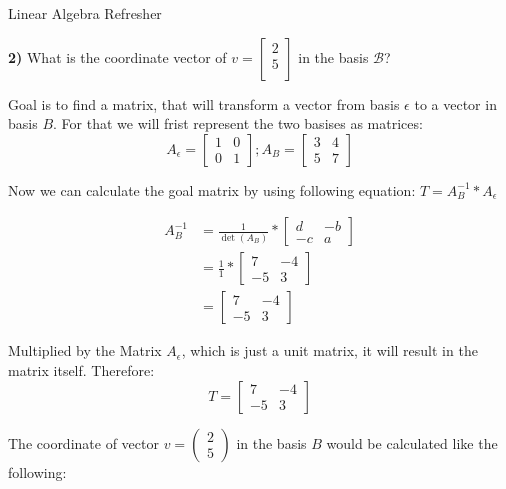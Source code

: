 \documentclass[
	english,
        solution=true
	]{tudaexercise}
\begin{document}
\begin{task}[points=28]{Linear Algebra Refresher}
\begin{subtask}[points=5,title=Basis Transformation ]
\textbf{2)} What is the coordinate vector of $v=\begin{bmatrix}
2\\
5\\
\end{bmatrix}$ in the basis $\mathcal{B}$?

\begin{solution}
Goal is to find a matrix, that will transform a vector from basis $\epsilon$ to a vector in basis $B$. For that we will frist represent the two basises as matrices:
\[A_\epsilon=\begin{bmatrix}
    1 & 0 \\0 & 1
\end{bmatrix}; A_B=\begin{bmatrix}
    3 & 4 \\ 5 & 7
\end{bmatrix}\]

Now we can calculate the goal matrix by using following equation: $T=A_B^{-1}*A_\epsilon$

\begin{align*}
    A_B^{-1}&=\frac{1}{\det(A_B)}*\begin{bmatrix}
        d & -b \\ -c & a
    \end{bmatrix}\\
    &= \frac{1}{1}*\begin{bmatrix}
        7 & -4 \\ -5 & 3
    \end{bmatrix}\\
    &= \begin{bmatrix}
        7 & -4 \\ -5 & 3
    \end{bmatrix}
\end{align*}

Multiplied by the Matrix $A_\epsilon$, which is just a unit matrix, it will result in the matrix itself. Therefore:
\[T=\begin{bmatrix}
    7 & -4 \\ -5 & 3
\end{bmatrix}\]

The coordinate of vector $v=\begin{pmatrix}
    2 \\ 5
\end{pmatrix}$ in the basis $B$ would be calculated like the following:


\end{solution}
\end{subtask}
\end{task}
\end{document}
